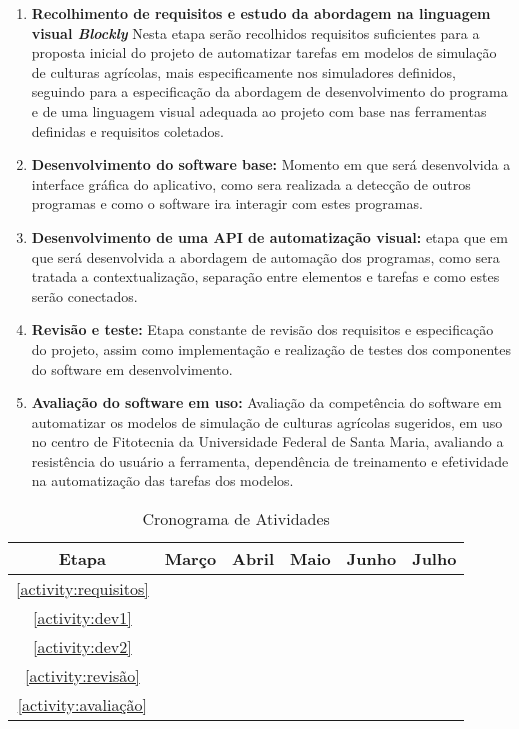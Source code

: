 \documentclass[12pt]{article}
\begin{document}
	\begin{enumerate}
		\item \label{activity:requisitos} \textbf{Recolhimento de requisitos e estudo da abordagem na linguagem visual \emph{Blockly}}
		Nesta etapa serão recolhidos requisitos suficientes para a proposta inicial do projeto de automatizar tarefas em modelos de simulação de culturas agrícolas, mais especificamente nos simuladores definidos, seguindo para a especificação da abordagem de desenvolvimento do programa e de uma linguagem visual adequada ao projeto com base nas ferramentas definidas e requisitos coletados.
		\item \label{activity:dev1} \textbf{Desenvolvimento do software base:}
		Momento em que será desenvolvida a interface gráfica do aplicativo, como sera realizada a detecção de outros programas e como o software ira interagir com estes programas. 
		\item \label{activity:dev2} \textbf{Desenvolvimento de uma API de automatização visual:}
		etapa que em que será desenvolvida a abordagem de automação dos programas, como sera tratada a contextualização, separação entre elementos e tarefas e como estes serão conectados.
		\item \label{activity:revisão} \textbf{Revisão e teste:}
		Etapa constante de revisão dos requisitos e especificação do projeto, assim como implementação e realização de testes dos componentes do software em desenvolvimento.
		\item \label{activity:avaliação} \textbf{Avaliação do software em uso:}
		Avaliação da competência do software em automatizar os modelos de simulação de culturas agrícolas sugeridos, em uso no centro de Fitotecnia da Universidade Federal de Santa Maria, avaliando a resistência do usuário a ferramenta, dependência de treinamento e efetividade na automatização das tarefas dos modelos.
	\end{enumerate}
	
	\begin{table}[ht]
		\centering
		\begin{tabular}{c|ccccc}
			Etapa & Março & Abril & Maio & Junho & Julho \\ \hline
			\ref{activity:requisitos} & \checkmark & & & & \\
			\ref{activity:dev1} & \checkmark & \checkmark & \checkmark & & \\
			\ref{activity:dev2} & & \checkmark & \checkmark & \checkmark & \\
			\ref{activity:revisão} & \checkmark & \checkmark & \checkmark & \checkmark & \checkmark \\
			\ref{activity:avaliação} & & & & \checkmark & \checkmark \\
		\end{tabular}
		\caption{Cronograma de Atividades}
	\end{table}
	
\end{document}
